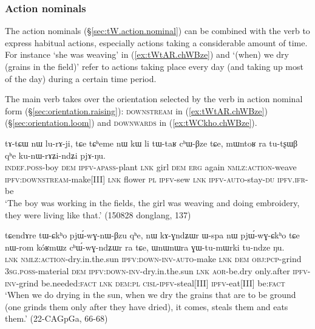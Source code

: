 \subsubsection{Action nominals} \label{sec:action.nominal.Bzu}
The  action nominals (§\ref{sec:tW.action.nominal}) can be combined with the verb  to express habitual actions, especially actions taking a considerable amount of time. For instance  `she was weaving' in (\ref{ex:tWtAR.chWBze}) and  `(when) we dry (grains in the field)' refer to actions taking place every day (and taking up most of the day) during a certain time period.  

The main verb  takes over the orientation selected by the verb in action nominal form (§\ref{sec:orientation.raising}): \textsc{downstream} in (\ref{ex:tWtAR.chWBze}) (§\ref{sec:orientation.loom}) and \textsc{downwards} in (\ref{ex:tWCkho.chWBze}).

\begin{exe}
	\ex \label{ex:tWtAR.chWBze}
	\gll tɤ-tɕɯ nɯ lu-rɤ-ji,  tɕe tɕʰeme nɯ kɯ li tɯ-taʁ cʰɯ-βze tɕe, mɯntoʁ ra tu-tʂɯβ qʰe ku-nɯ-rɤʑi-ndʑi pjɤ-ŋu.  \\
	\textsc{indef}.\textsc{poss}-boy \textsc{dem} \textsc{ipfv}-\textsc{apass}-plant \textsc{lnk} girl \textsc{dem} \textsc{erg} again \textsc{nmlz}:\textsc{action}-weave \textsc{ipfv}:\textsc{downstream}-make[III] \textsc{lnk} flower \textsc{pl} \textsc{ipfv}-sew \textsc{lnk} \textsc{ipfv}-\textsc{auto}-stay-\textsc{du} \textsc{ipfv}.\textsc{ifr}-be \\
	\glt `The boy was working in the fields, the girl was weaving and doing embroidery, they were living like that.' (150828 donglang, 137)
\end{exe}


\begin{exe}
	\ex \label{ex:tWCkho.chWBze}
	\gll tɕendɤre tɯ-ɕkʰo pjɯ́-wɣ-nɯ-βzu qʰe, nɯ kɤ-ɣndʑɯr ɯ-spa nɯ pjɯ́-wɣ-ɕkʰo tɕe nɯ-rom kóʁmɯz cʰɯ́-wɣ-ndʑɯr ra tɕe, ɯnɯnɯra ɣɯ-tu-mɯrki tu-ndze ŋu. \\
	\textsc{lnk} \textsc{nmlz}:\textsc{action}-dry.in.the.sun \textsc{ipfv}:\textsc{down}-\textsc{inv}-\textsc{auto}-make \textsc{lnk} \textsc{dem} \textsc{obj}:\textsc{pcp}-grind \textsc{3sg}.\textsc{poss}-material \textsc{dem} \textsc{ipfv}:\textsc{down}-\textsc{inv}-dry.in.the.sun \textsc{lnk} \textsc{aor}-be.dry only.after \textsc{ipfv}-\textsc{inv}-grind be.needed:\textsc{fact} \textsc{lnk} \textsc{dem}:\textsc{pl} \textsc{cisl}-\textsc{ipfv}-steal[III] \textsc{ipfv}-eat[III] be:\textsc{fact} \\
	\glt `When we do drying in the sun, when we dry the grains that are to be ground (one grinds them only after they have dried), it comes, steals them and eats them.' (22-CAGpGa, 66-68)
\end{exe}

